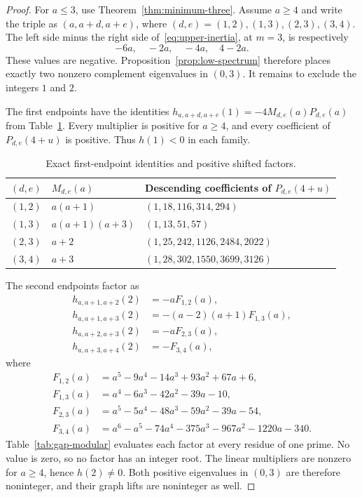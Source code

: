 \begin{proof}
For $a\leq3$, use Theorem~\ref{thm:minimum-three}. Assume $a\geq4$
and write the triple as $(a,a+d,a+e)$, where
$(d,e)=(1,2),(1,3),(2,3),(3,4)$. The left side minus the right side
of~\eqref{eq:upper-inertia}, at $m=3$, is respectively
\[
-6a,\quad-2a,\quad-4a,\quad4-2a.
\]
These values are negative. Proposition~\ref{prop:low-spectrum}
therefore places exactly two nonzero complement eigenvalues in $(0,3)$.
It remains to exclude the integers $1$ and $2$.

The first endpoints have the identities
$h_{a,a+d,a+e}(1)=-4M_{d,e}(a)P_{d,e}(a)$ from
Table~\ref{tab:gap-first-endpoints}. Every multiplier is positive for
$a\geq4$, and every coefficient of $P_{d,e}(4+u)$ is positive.
Thus $h(1)<0$ in each family.

\begin{table}[ht]
\centering
\begin{tabular}{lll}
\toprule
$(d,e)$&$M_{d,e}(a)$&Descending coefficients of $P_{d,e}(4+u)$\\
\midrule
$(1,2)$&$a(a+1)$&$(1,18,116,314,294)$\\
$(1,3)$&$a(a+1)(a+3)$&$(1,13,51,57)$\\
$(2,3)$&$a+2$&$(1,25,242,1126,2484,2022)$\\
$(3,4)$&$a+3$&$(1,28,302,1550,3699,3126)$\\
\bottomrule
\end{tabular}
\caption{Exact first-endpoint identities and positive shifted factors.}
\label{tab:gap-first-endpoints}
\end{table}

The second endpoints factor as
\begin{align*}
h_{a,a+1,a+2}(2)&=-aF_{1,2}(a),\\
h_{a,a+1,a+3}(2)&=-(a-2)(a+1)F_{1,3}(a),\\
h_{a,a+2,a+3}(2)&=-aF_{2,3}(a),\\
h_{a,a+3,a+4}(2)&=-F_{3,4}(a),
\end{align*}
where
\begin{align*}
F_{1,2}(a)&=a^5-9a^4-14a^3+93a^2+67a+6,\\
F_{1,3}(a)&=a^4-6a^3-42a^2-39a-10,\\
F_{2,3}(a)&=a^5-5a^4-48a^3-59a^2-39a-54,\\
F_{3,4}(a)&=a^6-a^5-74a^4-375a^3-967a^2-1220a-340.
\end{align*}
Table~\ref{tab:gap-modular} evaluates each factor at every residue of
one prime. No value is zero, so no factor has an integer root. The
linear multipliers are nonzero for $a\geq4$, hence $h(2)\ne0$.
Both positive eigenvalues in $(0,3)$ are therefore noninteger, and
their graph lifts are noninteger as well.


\end{proof}

